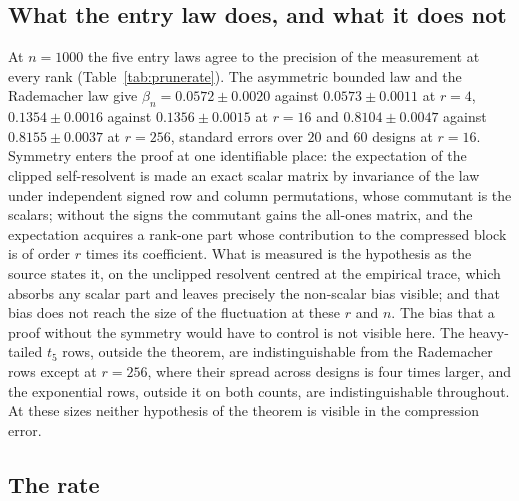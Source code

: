 \documentclass[11pt]{article}
\theoremstyle{definition}
\newcommand{\numBetaBernFour}{0.0572\pm0.0020}
\newcommand{\numBetaBernSixteen}{0.1354\pm0.0016}
\newcommand{\numBetaBernTwoFiveSix}{0.8104\pm0.0047}
\newcommand{\numBetaRadFour}{0.0573\pm0.0011}
\newcommand{\numBetaRadSixteen}{0.1356\pm0.0015}
\newcommand{\numBetaRadTwoFiveSix}{0.8155\pm0.0037}
\newcommand{\numNBernSixteen}{20}
\newcommand{\numNRadSixteen}{60}
\begin{document}
\subsection{What the entry law does, and what it does not}

At $n=1000$ the five entry laws agree to the precision of the measurement at every rank
(Table~\ref{tab:prunerate}). The asymmetric bounded law and the Rademacher law give
$\beta_n=\numBetaBernFour$ against $\numBetaRadFour$ at $r=4$, $\numBetaBernSixteen$ against
$\numBetaRadSixteen$ at $r=16$ and $\numBetaBernTwoFiveSix$ against $\numBetaRadTwoFiveSix$ at
$r=256$, standard errors over $\numNBernSixteen$ and $\numNRadSixteen$ designs at $r=16$. Symmetry
enters the proof at one identifiable place: the expectation of the clipped self-resolvent is made an
exact scalar matrix by invariance of the law under independent signed row and column permutations,
whose commutant is the scalars; without the signs the commutant gains the all-ones matrix, and the
expectation acquires a rank-one part whose contribution to the compressed block is of order $r$
times its coefficient. What is measured is the hypothesis as the source states it, on the unclipped
resolvent centred at the empirical trace, which absorbs any scalar part and leaves precisely the
non-scalar bias visible; and that bias does not reach the size of the fluctuation at these $r$ and
$n$. The bias that a proof without the symmetry would have to control is not visible here. The
heavy-tailed $t_5$ rows, outside the theorem, are indistinguishable from
the Rademacher rows except at $r=256$, where their spread across designs is four times larger, and the
exponential rows, outside it on both counts, are indistinguishable throughout. At these sizes neither
hypothesis of the theorem is visible in the compression error.

\subsection{The rate}
\end{document}
